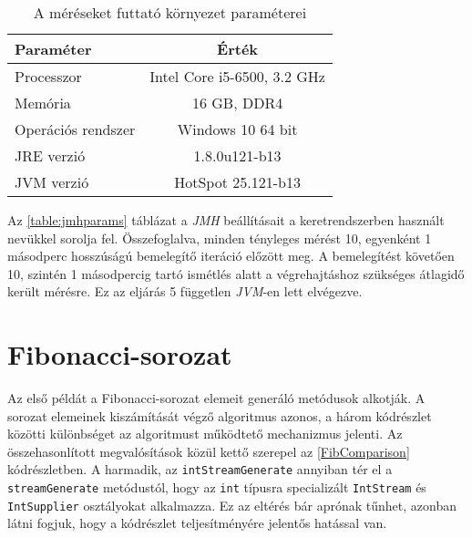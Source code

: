 \begin{table}[h]
\captionsetup{justification=centering}
\centering
  \begin{tabular}{|| l | c ||}
  \hline
  Paraméter & Érték \\
  \hline \hline
  Processzor                  & Intel Core i5-6500, 3.2 GHz \\
  Memória                     & 16 GB, DDR4 \\
  \hline
  Operációs rendszer                        & Windows 10 64 bit \\
  \hline
  JRE verzió                  & 1.8.0u121-b13 \\
  JVM verzió                  & HotSpot 25.121-b13 \\
  \hline
  \end{tabular}
\caption{A méréseket futtató környezet paraméterei}  
\label{table:envparams}
\end{table}

Az \ref{table:jmhparams} táblázat a \textit{JMH} beállításait a keretrendszerben használt nevükkel sorolja fel. Összefoglalva, minden tényleges mérést 10, egyenként 1 másodperc hosszúságú bemelegítő iteráció előzött meg. A bemelegítést követően 10, szintén 1 másodpercig tartó ismétlés alatt a végrehajtáshoz szükséges átlagidő került mérésre. Ez az eljárás 5 független \textit{JVM}-en lett elvégezve.

\section{Fibonacci-sorozat}

Az első példát a Fibonacci-sorozat elemeit generáló metódusok alkotják. A sorozat elemeinek kiszámítását végző algoritmus azonos, a három kódrészlet közötti különbséget az algoritmust működtető mechanizmus jelenti. Az összehasonlított megvalósítások közül kettő szerepel az \ref{FibComparison} kódrészletben. A harmadik, az \texttt{intStreamGenerate} annyiban tér el a \texttt{streamGenerate} metódustól, hogy az \texttt{int} típusra specializált \texttt{IntStream} és \texttt{IntSupplier} osztályokat alkalmazza. Ez az eltérés bár aprónak tűnhet, azonban látni fogjuk, hogy a kódrészlet teljesítményére jelentős hatással van.

